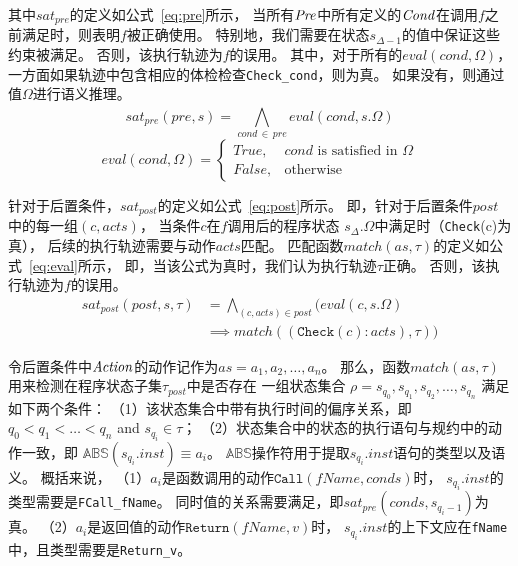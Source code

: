 其中$sat_{pre}$的定义如公式~\ref{eq:pre}所示，
当所有$\mathit{Pre}$中所有定义的$\mathit{Cond}$在调用$f$之前满足时，则表明$f$被正确使用。
特别地，我们需要在状态$s_{\Delta-1}$的值中保证这些约束被满足。
否则，该执行轨迹为$f$的误用。
其中，对于所有的$eval(cond, \Omega)$，一方面如果轨迹中包含相应的体检检查\texttt{Check\_cond}，则为真。
如果没有，则通过值$\Omega$进行语义推理。
\begin{equation}
\label{eq:pre}
sat_{pre}(\mathit{pre}, s) = \bigwedge_{cond\,\in\,\mathit{pre}}^{} eval(cond, s.\Omega)
\end{equation}
\begin{equation}
\label{eq:eval}
eval(\mathit{cond}, \Omega) = 
\begin{cases}
True, & \text{$\mathit{cond}$ is satisfied in $\Omega$}\\
False,              & \text{otherwise}
\end{cases}
\end{equation}


针对于后置条件，$sat_{post}$的定义如公式~\ref{eq:post}所示。
即，针对于后置条件$\mathit{post}$中的每一组$(c,\mathit{acts})$，
当条件$c$在$f$调用后的程序状态 $s_{\Delta}.\Omega$中满足时（\texttt{Check}(c)为真），
后续的执行轨迹需要与动作$\mathit{acts}$匹配。
匹配函数$\mathit{match}(\mathit{as}, \tau)$的定义如公式~\ref{eq:eval}所示，
即，当该公式为真时，我们认为执行轨迹$\tau$正确。
否则，该执行轨迹为$f$的误用。
\begin{align}
\label{eq:post}
sat_{post}(\mathit{post},s,\tau) &=  \bigwedge_{(c,acts) \in \mathit{post}}^{} 
\Big( eval(\mathit{c},s.\Omega) \nonumber \\
& \implies
match((\texttt{Check}(c):acts), \tau) \Big)
\end{align}

令后置条件中$\mathit{Action}$的动作记作为$\mathit{as} = a_1, a_2, \dots,a_n$。
那么，函数$\mathit{match}(\mathit{as}, \tau)$用来检测在程序状态子集$\tau_{post}$中是否存在
一组状态集合
$\rho = s_{q_0}, s_{q_1}, s_{q_2}, \dots,s_{q_n}$
满足如下两个条件：
（1）该状态集合中带有执行时间的偏序关系，即
$q_0 < q_1 < \ldots < q_n$ and $s_{q_i}\in\tau$；
（2）状态集合中的状态的执行语句与规约中的动作一致，即
$\mathbb{ABS}(s_{q_i}.inst) \equiv a_i$。
$\mathbb{ABS}$操作符用于提取$s_{q_i}.inst$语句的类型以及语义。
概括来说，
（1）$a_i$是函数调用的动作$\texttt{Call}(\mathit{fName},\mathit{conds})$时，
$s_{q_i}.inst$的类型需要是\texttt{FCall\_fName}。
同时值的关系需要满足，即$sat_{pre}(conds,s_{q_i-1})$为真。
（2）$a_i$是返回值的动作$\texttt{Return}(\mathit{fName},\mathit{v})$时，
$s_{q_i}.inst$的上下文应在\texttt{fName}中，且类型需要是\texttt{Return\_v}。



